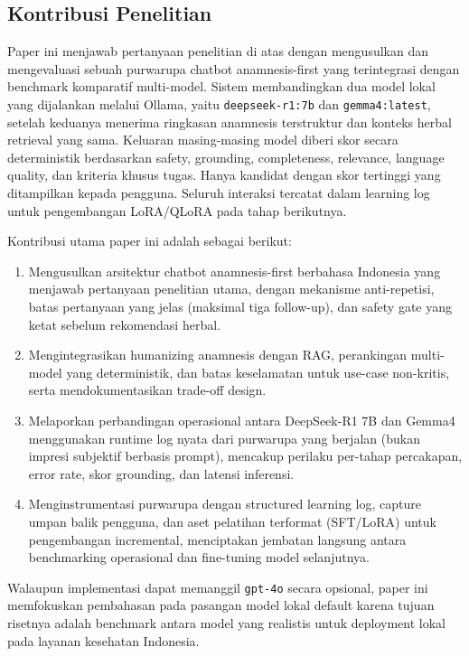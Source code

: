 \documentclass[conference]{IEEEtran}
\begin{document}
\subsection{Kontribusi Penelitian}
Paper ini menjawab pertanyaan penelitian di atas dengan mengusulkan dan mengevaluasi sebuah purwarupa chatbot anamnesis-first yang terintegrasi dengan benchmark komparatif multi-model. Sistem membandingkan dua model lokal yang dijalankan melalui Ollama, yaitu \texttt{deepseek-r1:7b} dan \texttt{gemma4:latest}, setelah keduanya menerima ringkasan anamnesis terstruktur dan konteks herbal retrieval yang sama. Keluaran masing-masing model diberi skor secara deterministik berdasarkan safety, grounding, completeness, relevance, language quality, dan kriteria khusus tugas. Hanya kandidat dengan skor tertinggi yang ditampilkan kepada pengguna. Seluruh interaksi tercatat dalam learning log untuk pengembangan LoRA/QLoRA pada tahap berikutnya.

Kontribusi utama paper ini adalah sebagai berikut:
\begin{enumerate}
\item Mengusulkan arsitektur chatbot anamnesis-first berbahasa Indonesia yang menjawab pertanyaan penelitian utama, dengan mekanisme anti-repetisi, batas pertanyaan yang jelas (maksimal tiga follow-up), dan safety gate yang ketat sebelum rekomendasi herbal.
\item Mengintegrasikan humanizing anamnesis dengan RAG, perankingan multi-model yang deterministik, dan batas keselamatan untuk use-case non-kritis, serta mendokumentasikan trade-off design.
\item Melaporkan perbandingan operasional antara DeepSeek-R1 7B dan Gemma4 menggunakan runtime log nyata dari purwarupa yang berjalan (bukan impresi subjektif berbasis prompt), mencakup perilaku per-tahap percakapan, error rate, skor grounding, dan latensi inferensi.
\item Menginstrumentasi purwarupa dengan structured learning log, capture umpan balik pengguna, dan aset pelatihan terformat (SFT/LoRA) untuk pengembangan incremental, menciptakan jembatan langsung antara benchmarking operasional dan fine-tuning model selanjutnya.
\end{enumerate}


Walaupun implementasi dapat memanggil \texttt{gpt-4o} secara opsional, paper ini memfokuskan pembahasan pada pasangan model lokal default karena tujuan risetnya adalah benchmark antara model yang realistis untuk deployment lokal pada layanan kesehatan Indonesia.
\end{document}
